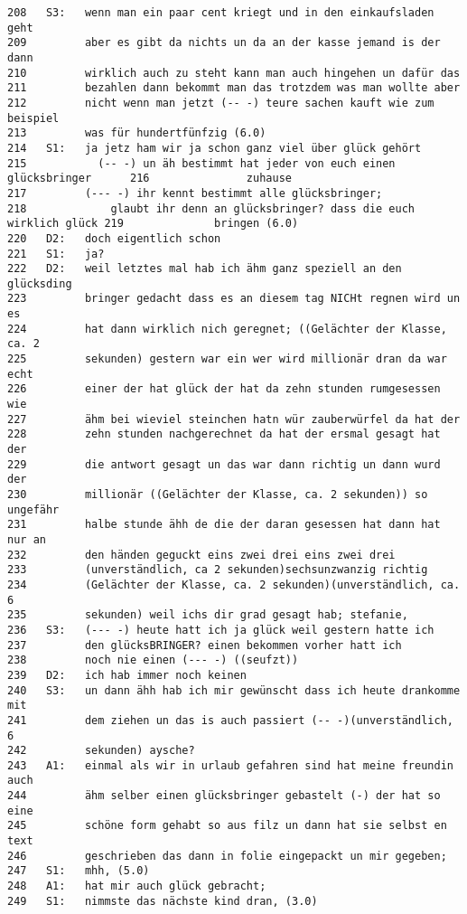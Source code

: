 \begin{lstlisting}[language={}]
208   S3:   wenn man ein paar cent kriegt und in den einkaufsladen geht 
209         aber es gibt da nichts un da an der kasse jemand is der dann 
210         wirklich auch zu steht kann man auch hingehen un dafür das 
211         bezahlen dann bekommt man das trotzdem was man wollte aber 
212         nicht wenn man jetzt (-- -) teure sachen kauft wie zum beispiel 
213         was für hundertfünfzig (6.0)
214   S1:   ja jetz ham wir ja schon ganz viel über glück gehört 
215           (-- -) un äh bestimmt hat jeder von euch einen glücksbringer      216               zuhause 
217         (--- -) ihr kennt bestimmt alle glücksbringer; 
218             glaubt ihr denn an glücksbringer? dass die euch wirklich glück 219              bringen (6.0)
220   D2:   doch eigentlich schon
221   S1:   ja?
222   D2:   weil letztes mal hab ich ähm ganz speziell an den glücksding  
223         bringer gedacht dass es an diesem tag NICHt regnen wird un es 
224         hat dann wirklich nich geregnet; ((Gelächter der Klasse, ca. 2 
225         sekunden) gestern war ein wer wird millionär dran da war echt 
226         einer der hat glück der hat da zehn stunden rumgesessen wie 
227         ähm bei wieviel steinchen hatn wür zauberwürfel da hat der 
228         zehn stunden nachgerechnet da hat der ersmal gesagt hat der 
229         die antwort gesagt un das war dann richtig un dann wurd der 
230         millionär ((Gelächter der Klasse, ca. 2 sekunden)) so ungefähr 
231         halbe stunde ähh de die der daran gesessen hat dann hat nur an  
232         den händen geguckt eins zwei drei eins zwei drei 
233         (unverständlich, ca 2 sekunden)sechsunzwanzig richtig 
234         (Gelächter der Klasse, ca. 2 sekunden)(unverständlich, ca. 6 
235         sekunden) weil ichs dir grad gesagt hab; stefanie,
236   S3:   (--- -) heute hatt ich ja glück weil gestern hatte ich                
237         den glücksBRINGER? einen bekommen vorher hatt ich
238         noch nie einen (--- -) ((seufzt))
239   D2:   ich hab immer noch keinen
240   S3:   un dann ähh hab ich mir gewünscht dass ich heute drankomme mit  
241         dem ziehen un das is auch passiert (-- -)(unverständlich, 6 
242         sekunden) aysche?
243   A1:   einmal als wir in urlaub gefahren sind hat meine freundin auch 
244         ähm selber einen glücksbringer gebastelt (-) der hat so eine 
245         schöne form gehabt so aus filz un dann hat sie selbst en text 
246         geschrieben das dann in folie eingepackt un mir gegeben;
247   S1:   mhh, (5.0) 
248   A1:   hat mir auch glück gebracht;
249   S1:   nimmste das nächste kind dran, (3.0)

\end{lstlisting}
